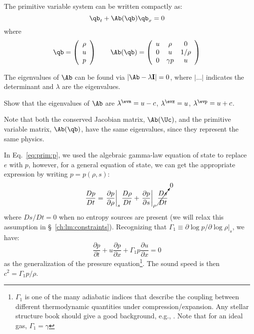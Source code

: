 %
The primitive variable system can be written compactly as:
\begin{equation}
\qb_t + \Ab(\qb) \qb_x = 0
\end{equation}
where
\begin{equation}
\qb = \left ( \begin{array}{c} \rho \\ u \\ p \end{array} \right )
%
\qquad
\Ab(\qb) = \left ( \begin{array}{ccc} u  & \rho     & 0 \\
                                  0  &  u       & 1/\rho \\
                                  0  & \gamma p & u \end{array} \right )
\label{eq:primitivesystem}
\end{equation}



The eigenvalues of $\Ab$ can be found via $| \Ab - \lambda {\bf I} | = 0$,
where $|\ldots|$ indicates the determinant and $\lambda$ are the eigenvalues.
\begin{exercise}
{
Show that the eigenvalues of $\Ab$ are $\lambda^\evm = u -c$, $\lambda^\evz = u$, $\lambda^\evp = u+c$.
}
\end{exercise}
Note that both the conserved Jacobian matrix, $\Ab(\Uc)$, and the
primitive variable matrix, $\Ab(\qb)$, have the same eigenvalues,
 since they represent the same physics.

In Eq.~\ref{eq:prim:p}, we used the algebraic gamma-law
equation of state to replace $e$ with $p$, however, for a general
equation of state, we can get the appropriate expression by writing $p
= p(\rho, s)$:
\begin{equation}
\label{eq:euler:presnosource}
\frac{Dp}{Dt} = \left . \frac{\partial p}{\partial \rho} \right |_s
     \frac{D\rho}{Dt} +
     \left . \frac{\partial p}{\partial s} \right |_\rho
     \cancelto{0}{\frac{Ds}{Dt}}
\end{equation}
where $Ds/Dt = 0$ when no entropy sources are present (we will relax this
assumption in \S~\ref{ch:lm:constraints}).  Recognizing
that $\Gamma_1 \equiv \partial \log p/\partial \log \rho |_s$, we have:
\begin{equation}
\frac{\partial p}{\partial t} + u \frac{\partial p}{\partial x}
  + \Gamma_1 p \frac{\partial u}{\partial x} = 0  \label{eq:euler:pgeneral}
\end{equation}
as the generalization of the pressure equation\footnote{$\Gamma_1$ is one of the
many adiabatic indices that describe the coupling between different
thermodynamic quantities under compression/expansion.  Any stellar structure
book should give a good background, e.g., \cite{HKT}.  Note that for an ideal gas, $\Gamma_1 = \gamma$}.
The sound speed is then $c^2 = \Gamma_1 p /\rho$.

